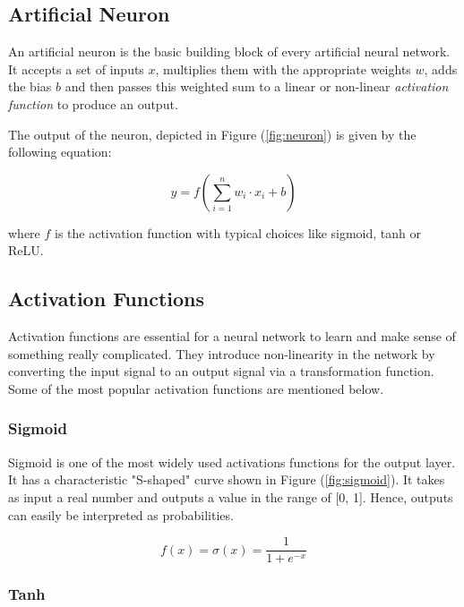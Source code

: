 \documentclass[a4paper, 12pt]{article}
\numberwithin{equation}{section}
\numberwithin{figure}{section}
\numberwithin{table}{section}
\begin{document}
	\subsection{Artificial Neuron}
	
	An artificial neuron is the basic building block of every artificial neural network. It accepts a set of inputs $x$, multiplies them with the appropriate weights $w$, adds the bias $b$ and then passes this weighted sum to a linear or non-linear \textit{activation function} to produce an output.
	
	
	
	The output of the neuron, depicted in Figure (\ref{fig:neuron}) is given by the following equation:
	
	\begin{equation}
	y = f(\sum_{i=1}^{n}w_i \cdot x_i + b)
	\end{equation}
	
	\noindent where $f$ is the activation function with typical choices like sigmoid, tanh or ReLU.\par
	
	\subsection{Activation Functions}
	
	Activation functions are essential for a neural network to learn and make sense of something really complicated. They introduce non-linearity in the network by converting the input signal to an output signal via a transformation function. Some of the most popular activation functions are mentioned below.
	
	\subsubsection{Sigmoid}
	
	Sigmoid is one of the most widely used activations functions for the output layer. It has a characteristic "S-shaped" curve shown in Figure (\ref{fig:sigmoid}). It takes as input a real number and outputs a value in the range of [0, 1]. Hence, outputs can easily be interpreted as probabilities.
	
	\begin{equation}
		f(x) = \sigma(x) = \frac{1}{1 + e^{-x}}
	\end{equation}

	

	\subsubsection{Tanh}
	
\end{document}

